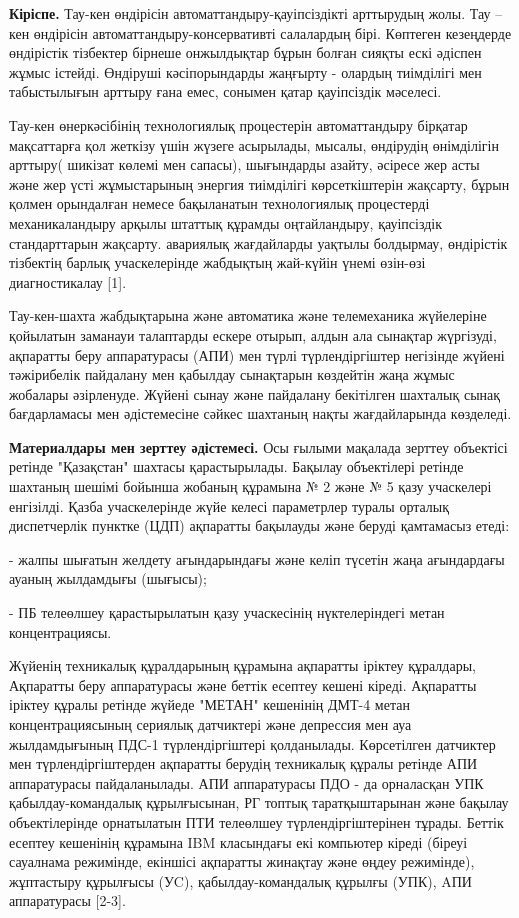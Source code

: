 \begin{multicols}{2}
{\bfseries Кіріспе.} Тау-кен өндірісін автоматтандыру-қауіпсіздікті
арттырудың жолы. Тау -- кен өндірісін автоматтандыру-консервативті
салалардың бірі. Көптеген кезеңдерде өндірістік тізбектер бірнеше
онжылдықтар бұрын болған сияқты ескі әдіспен жұмыс істейді. Өндіруші
кәсіпорындарды жаңғырту - олардың тиімділігі мен табыстылығын арттыру
ғана емес, сонымен қатар қауіпсіздік мәселесі.

Тау-кен өнеркәсібінің технологиялық процестерін автоматтандыру бірқатар
мақсаттарға қол жеткізу үшін жүзеге асырылады, мысалы, өндірудің
өнімділігін арттыру( шикізат көлемі мен сапасы), шығындарды азайту,
әсіресе жер асты және жер үсті жұмыстарының энергия тиімділігі
көрсеткіштерін жақсарту, бұрын қолмен орындалған немесе бақыланатын
технологиялық процестерді механикаландыру арқылы штаттық құрамды
оңтайландыру, қауіпсіздік стандарттарын жақсарту. авариялық жағдайларды
уақтылы болдырмау, өндірістік тізбектің барлық учаскелерінде жабдықтың
жай-күйін үнемі өзін-өзі диагностикалау {[}1{]}.

Тау-кен-шахта жабдықтарына және автоматика және телемеханика жүйелеріне
қойылатын заманауи талаптарды ескере отырып, алдын ала сынақтар
жүргізуді, ақпаратты беру аппаратурасы (АПИ) мен түрлі түрлендіргіштер
негізінде жүйені тәжірибелік пайдалану мен қабылдау сынақтарын көздейтін
жаңа жұмыс жобалары әзірленуде. Жүйені сынау және пайдалану бекітілген
шахталық сынақ бағдарламасы мен әдістемесіне сәйкес шахтаның нақты
жағдайларында көзделеді.

{\bfseries Материалдары мен зерттеу әдістемесі.} Осы ғылыми мақалада
зерттеу объектісі ретінде "Қазақстан" шахтасы қарастырылады. Бақылау
объектілері ретінде шахтаның шешімі бойынша жобаның құрамына № 2 және №
5 қазу учаскелері енгізілді. Қазба учаскелерінде жүйе келесі параметрлер
туралы орталық диспетчерлік пунктке (ЦДП) ақпаратты бақылауды және
беруді қамтамасыз етеді:

- жалпы шығатын желдету ағындарындағы және келіп түсетін жаңа
ағындардағы ауаның жылдамдығы (шығысы);

- ПБ телеөлшеу қарастырылатын қазу учаскесінің нүктелеріндегі метан
концентрациясы.

Жүйенің техникалық құралдарының құрамына ақпаратты іріктеу құралдары,
Ақпаратты беру аппаратурасы және беттік есептеу кешені кіреді. Ақпаратты
іріктеу құралы ретінде жүйеде "МЕТАН" кешенінің ДМТ-4 метан
концентрациясының сериялық датчиктері және депрессия мен ауа
жылдамдығының ПДС-1 түрлендіргіштері қолданылады. Көрсетілген датчиктер
мен түрлендіргіштерден ақпаратты берудің техникалық құралы ретінде АПИ
аппаратурасы пайдаланылады. АПИ аппаратурасы ПДО - да орналасқан УПК
қабылдау-командалық құрылғысынан, РГ топтық таратқыштарынан және бақылау
объектілерінде орнатылатын ПТИ телеөлшеу түрлендіргіштерінен тұрады.
Беттік есептеу кешенінің құрамына IBM класындағы екі компьютер кіреді
(біреуі сауалнама режимінде, екіншісі ақпаратты жинақтау және өңдеу
режимінде), жұптастыру құрылғысы (УC), қабылдау-командалық құрылғы
(УПК), AПИ аппаратурасы {[}2-3{]}.


\end{multicols}
